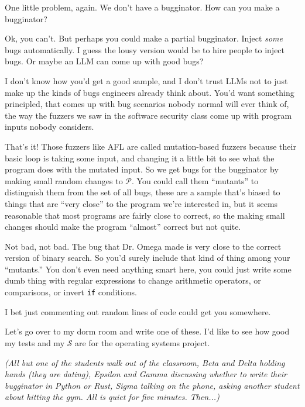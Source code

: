 \documentclass[sigplan]{acmart}
\begin{document}
  One little problem, again.   We don't
have a bugginator.  How can you make a bugginator?

   Ok, you can't.  But perhaps you could
make a partial bugginator.  Inject \emph{some} bugs automatically.  I
guess the lousy version would be to hire people to inject bugs.  Or
maybe an LLM can come up with good bugs?

  I don't know how you'd get a good sample,
and I don't trust LLMs not to just make up the kinds of bugs engineers
already think about.  You'd want something principled, that comes up
with bug scenarios nobody normal will ever think of, the way the
fuzzers we saw in the software security class
come up with program inputs nobody considers.

  That's it!  Those fuzzers like AFL are
called mutation-based fuzzers because their basic loop is taking some
input, and changing it a little bit to see what the program does with
the mutated input.  So we get bugs for the bugginator by making small
random changes to $\mathcal{P}$.  You could call them ``mutants'' to
distinguish them from the set of all bugs, these are a sample that's
biased to things that are ``very close'' to the program we're
interested in, but it seems reasonable that most programs are fairly
close to correct, so the making small changes should make the program
``almost'' correct but not quite.

   Not bad, not bad.  The bug that Dr. Omega
made is very close to the correct version of binary search.  So you'd
surely include that kind of thing among your ``mutants.''   You don't
even need anything smart here, you could just write some dumb thing
with regular expressions to change arithmetic operators, or
comparisons, or invert {\tt if} conditions.

  I bet just commenting out random lines
of code could get you somewhere.

 Let's go over to my dorm room and write
one of these.  I'd like to see how good my tests and my $\mathcal{S}$
are for the operating systems project.

\vspace{0.1in}

\emph{(All but one of the students walk out of the classroom, Beta and Delta holding
  hands (they are dating), Epsilon and Gamma discussing whether to
  write their bugginator in Python or Rust, Sigma talking on the
  phone, asking another student about hitting the gym. All is quiet
  for five minutes.  Then...)}
\end{document}
